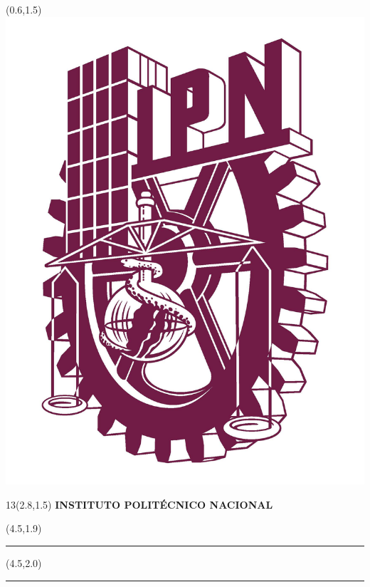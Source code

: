 	\thispagestyle{empty}
	\begin{textblock}{6}(0.6,1.5)
		\includegraphics[scale=0.12]{ipn.png}
	\end{textblock}
	
	\begin{center}	
		\begin{textblock} {13}(2.8,1.5)
			\Large{\textbf{INSTITUTO POLITÉCNICO NACIONAL}}
		\end{textblock}
	\end{center}
	
	\begin{textblock}{10}(4.5,1.9) 
		
		\begin{flushleft}
			\rule{13.5cm}{1.0mm}
		\end{flushleft}
	\end{textblock}
	
	\begin{textblock}{10}(4.5,2.0) 
		
		\begin{flushleft}
			\rule{13.5cm}{0.5mm}
		\end{flushleft}
	\end{textblock}
	
